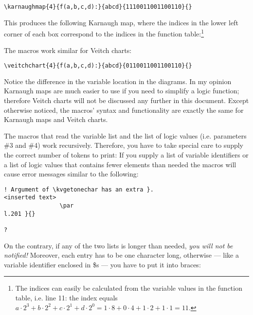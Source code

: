 \documentclass{article}
\begin{document}
\begin{verbatim}
\karnaughmap{4}{f(a,b,c,d):}{abcd}{1110011001100110}{}
\end{verbatim}

This produces the following Karnaugh map, where the indices in the lower left
corner of each box correspond to the indices in the function
table:\footnote{The indices can easily be calculated from the variable values
    in the function table, i.e. line 11: the index equals $a\cdot 2^3 + b\cdot
        2^2 + c \cdot 2^1 + d \cdot 2^0=1\cdot 8 + 0\cdot 4 + 1 \cdot 2 + 1 \cdot
        1=11$.}

\begin{center}
\end{center}

The macros work similar for Veitch charts:

\begin{verbatim}
\veitchchart{4}{f(a,b,c,d):}{abcd}{0110011001100110}{}
\end{verbatim}

\begin{center}
\end{center}

Notice the difference in the variable location in the diagrams. In my opinion
Karnaugh maps are much easier to use if you need to simplify a logic function;
therefore Veitch charts will not be discussed any further in this
document. Except otherwise noticed, the macros' syntax and functionality are
exactly the same for Karnaugh maps and Veitch charts.

The macros that read the variable list and the list of logic values
(i.e. parameters \#3 and \#4) work
recursively. Therefore, you have to take special care to supply the
correct number of tokens to print: If you supply a list of variable
identifiers or a list of logic values that contains fewer elements than needed
the macros will cause error messages similar to the following:

\begin{verbatim}
! Argument of \kvgetonechar has an extra }.
<inserted text>
                \par
l.201 }{}

?  
\end{verbatim}

On the contrary, if any of the two lists is longer than
needed, \emph{you will not be notified!}  Moreover, each entry has to be one
character long, otherwise --- like a variable identifier enclosed in \$s ---
you have to put it into braces:
\end{document}
